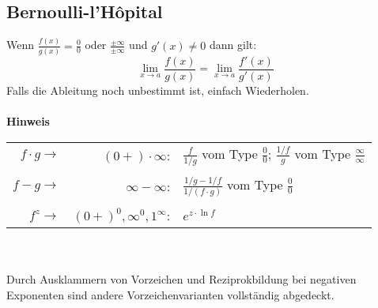 \subsection{Bernoulli-l’Hôpital }\label{lhopital}
Wenn $\frac{f(x)}{g(x)} = \frac{0}{0}$ oder $\frac{\pm\infty}{\pm\infty}$ und $g'(x) \neq 0$ dann gilt:
\[
\lim\limits_{x \rightarrow a}\frac{f(x)}{g(x)} = \lim\limits_{x \rightarrow a}\frac{f'(x)}{g'(x)}
\]
Falls die Ableitung noch unbestimmt ist, einfach Wiederholen.
\\ \\
\noindent\textbf{Hinweis}\\
\begin{tabular}{rrl}
	$f \cdot g\rightarrow $ & $ (0+) \cdot \infty$: & $\frac{f}{1 / g}$ vom Type $\frac{0}{0}$; $\frac{1/f}{g}$ vom Type $\frac{\infty}{\infty}$ \\ && \\
	$f - g \rightarrow $& $\infty - \infty$: & $\frac{1/g-1/f}{1/(f\cdot g)}$ vom Type $\frac{0}{0}$ \\ && \\
	$f^z \rightarrow$ & $ (0+)^0, \infty^0, 1^\infty$: & $e^{z\cdot\ln f}$
\end{tabular}\\ \\ 
Durch Ausklammern von Vorzeichen und Reziprokbildung bei negativen Exponenten sind andere Vorzeichenvarianten vollständig abgedeckt.
